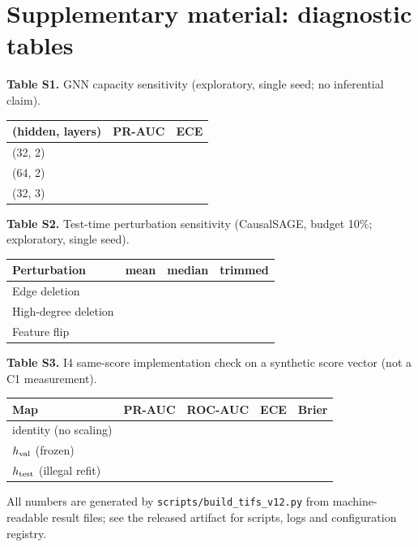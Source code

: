 \documentclass[lettersize,journal]{IEEEtran}
\begin{document}
\section*{Supplementary material: diagnostic tables}

\noindent \textbf{Table S1.} GNN capacity sensitivity (exploratory, single seed; no inferential claim).
\begin{table}[!t]
\centering\footnotesize
\begin{tabular}{lrr}
\toprule
(hidden, layers) & PR-AUC & ECE \\
\midrule
(32, 2) & \NumTuneNarrow{} & \NumTuneNarrowE{} \\
(64, 2) & \NumTuneWide{} & \NumTuneWideE{} \\
(32, 3) & \NumTuneDeep{} & \NumTuneDeepE{} \\
\bottomrule
\end{tabular}
\end{table}

\noindent \textbf{Table S2.} Test-time perturbation sensitivity (CausalSAGE, budget 10\%; exploratory, single seed).
\begin{table}[!t]
\centering\footnotesize
\begin{tabular}{lrrr}
\toprule
Perturbation & mean & median & trimmed \\
\midrule
Edge deletion & \NumAtEdMean{} & \NumAtEdMed{} & \NumAtEdTrim{} \\
High-degree deletion & \NumAtHdMean{} & \NumAtHdMed{} & \NumAtHdTrim{} \\
Feature flip & \NumAtFfMean{} & \NumAtFfMed{} & \NumAtFfTrim{} \\
\bottomrule
\end{tabular}
\end{table}

\noindent \textbf{Table S3.} I4 same-score implementation check on a synthetic score vector (not a C1 measurement).
\begin{table}[!t]
\centering\footnotesize
\begin{tabular}{lrrrr}
\toprule
Map & PR-AUC & ROC-AUC & ECE & Brier \\
\midrule
identity (no scaling) & \NumIFourPrVal{} & \NumIFourRocVal{} & \NumIFourEceRaw{} & \NumIFourBrierRaw{} \\
$h_{\rm val}$ (frozen) & \NumIFourPrVal{} & \NumIFourRocVal{} & \NumIFourEceVal{} & \NumIFourBrierVal{} \\
$h_{\rm test}$ (illegal refit) & \NumIFourPrTest{} & \NumIFourRocTest{} & \NumIFourEceTest{} & \NumIFourBrierTest{} \\
\bottomrule
\end{tabular}
\end{table}

\noindent All numbers are generated by \texttt{scripts/build\_tifs\_v12.py} from machine-readable result files; see the released artifact for scripts, logs and configuration registry.
\end{document}
